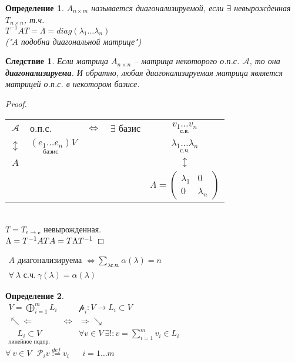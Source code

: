 \documentclass[12pt]{article}
\newtheorem{defin}{Определение}[subsection]
\newtheorem{corollary}{Следствие}[theorem]
\theoremstyle{remark}
\theoremstyle{definition}
\newcommand{\0}{\mathbb{0}}
\newcommand{\A}{\mathcal{A}}
\newcommand{\p}{\mathcal{P}}
\begin{document}
	\begin{defin}
		$A_{n\times m}$ называется диагонализируемой, если $\exists$ невырожденная $T_{n\times n}$, т.ч.\\ $T^{-1}AT = \Lambda = diag(\lambda_1\ldots\lambda_n)$\\
		("$A$ подобна диагональной матрице")
	\end{defin}
	\begin{corollary}
		Если матрица $A_{n\times n}$ -- матрица некоторого о.п.с. $\A$, то она \textbf{диагонализируема}. И обратно, любая диагонализируемая матрица является матрицей о.п.с. в некотором базисе.
	\end{corollary}
	\begin{proof}\ \\
		\begin{tabular}{clccc}
			$\A$ & о.п.с. & $\Leftrightarrow$ & $\exists$ базис & $\underset{\text{с.в.}}{v_1\ldots v_n}$\\
			$\updownarrow$ & $\underset{\text{базис}}{(e_1\ldots e_n)}V$ & & & $\underset{\text{с.ч.}}{\lambda_1\ldots \lambda_n}$\\
			$A$ & & & & $\updownarrow$\\
			& & & &$\Lambda = \begin{pmatrix}
				\lambda_1 & 0\\ 0 & \lambda_n
			\end{pmatrix}$
		\end{tabular}\\
		$T = T_{e\rightarrow \mathscr{v}}$ невырожденная.\\
		$\Lambda = T^{-1} A T\\
		A = T \Lambda T^{-1}$
	\end{proof}
	$\boxed{
		\begin{array}{r}
		A \text{ диагонализируема }\Leftrightarrow \sum\limits_{\lambda\text{с.ч.}}\alpha(\lambda) = n\\
		\forall \ \lambda \text{ с.ч.} \ \gamma(\lambda) = \alpha (\lambda)
		\end{array}
	}$
	\begin{defin}\ \\
		$\begin{array}{ccc}
			V = \bigoplus\limits_{i=1}^m L_i & & \mathscr{p}_i : V\rightarrow L_i \subset V\\
			\nwarrow\Leftarrow & \Leftrightarrow & \Rightarrow\searrow\\
			\underset{\text{линейное подпр.}}{L_i \subset V} & & \forall v \in V \  \exists ! : v = \sum\limits_{i=1}^m v_i \in L_i
		\end{array}$\\
		$\boxed{\forall \ v\in V \ \ \ \p_i v \overset{def}{:=}v_i} \ \ \ \ \ \ \; i = 1\ldots m$
	\end{defin}
\end{document}
